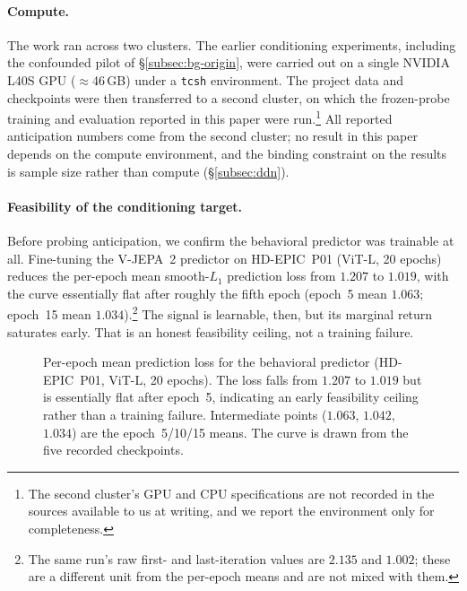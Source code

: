 \paragraph{Compute.}
The work ran across two clusters. The earlier conditioning experiments, including
the confounded pilot of \S\ref{subsec:bg-origin}, were carried out on a single
NVIDIA L40S GPU ($\approx$46\,GB) under a \texttt{tcsh} environment. The project
data and checkpoints were then transferred to a second cluster, on which the
frozen-probe training and evaluation reported in this paper were run.\footnote{The
second cluster's GPU and CPU specifications are not recorded in the sources
available to us at writing, and we report the environment only for completeness.} All reported anticipation numbers come from the second cluster; no
result in this paper depends on the compute environment, and the binding
constraint on the results is sample size rather than compute
(\S\ref{subsec:ddn}).

\paragraph{Feasibility of the conditioning target.}
Before probing anticipation, we confirm the behavioral predictor was trainable
at all. Fine-tuning the V-JEPA~2 predictor on HD-EPIC~P01 (ViT-L, 20 epochs)
reduces the per-epoch mean smooth-$L_1$ prediction loss from
$1.207$ to $1.019$, with the curve essentially flat after roughly the fifth
epoch (epoch~5 mean $1.063$; epoch~15 mean $1.034$).\footnote{The same run's
raw first- and last-iteration values are $2.135$ and $1.002$; these are a
different unit from the per-epoch means and are not mixed with them.} The signal
is learnable, then, but its marginal return saturates early. That is an honest
feasibility ceiling, not a training failure.

\begin{figure}[t]
  \centering
  \caption{Per-epoch mean prediction loss for the behavioral predictor
  (HD-EPIC~P01, ViT-L, 20 epochs). The loss falls from $1.207$ to $1.019$ but is
  essentially flat after epoch~5, indicating an early feasibility ceiling rather
  than a training failure. Intermediate points ($1.063$, $1.042$, $1.034$) are
  the epoch~5/10/15 means. The curve is drawn from the five recorded checkpoints.}
  \label{fig:loss}
\end{figure}

